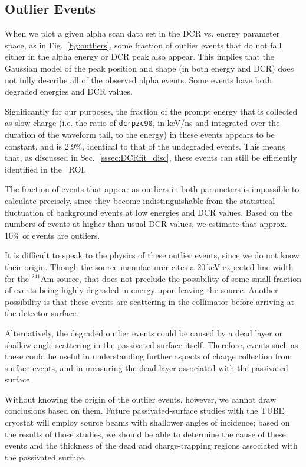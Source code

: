 \subsection{Outlier Events}\label{sssec:outliers}
When we plot a given alpha scan data set in the DCR vs. energy parameter space, as in Fig.~\ref{fig:outliers}, some fraction of outlier events that do not fall either in the alpha energy or DCR peak also appear. This implies that the Gaussian model of the peak position and shape (in both energy and DCR) does not fully describe all of the observed alpha events. Some events have both degraded energies and DCR values. 

Significantly for our purposes, the fraction of the prompt energy that is collected as slow charge (i.e. the ratio of {\tt dcrpzc90}, in keV/ns and integrated over the duration of the waveform tail, to the energy) in these events appears to be constant, and is 2.9\%, identical to that of the undegraded events. This means that, as discussed in Sec.~\ref{sssec:DCRfit_disc}, these events can still be efficiently identified in the \nonubb\ ROI.

The fraction of events that appear as outliers in both parameters is impossible to calculate precisely, since they become indistinguishable from the statistical fluctuation of background events at low energies and DCR values. Based on the numbers of events at higher-than-usual DCR values, we estimate that approx. 10\% of events are outliers. 

It is difficult to speak to the physics of these outlier events, since we do not know their origin. Though the source manufacturer cites a 20\,keV expected line-width for the $^{241}$Am source, that does not preclude the possibility of some small fraction of events being highly degraded in energy upon leaving the source. Another possibility is that these events are scattering in the collimator before arriving at the detector surface.

Alternatively, the degraded outlier events could be caused by a dead layer or shallow angle scattering in the passivated surface itself. Therefore, events such as these could be useful in understanding further aspects of charge collection from surface events, and in measuring the dead-layer associated with the passivated surface. 

Without knowing the origin of the outlier events, however, we cannot draw conclusions based on them. Future passivated-surface studies with the TUBE cryostat will employ source beams with shallower angles of incidence; based on the results of those studies, we should be able to determine the cause of these events and the thickness of the dead and charge-trapping regions associated with the passivated surface. 

